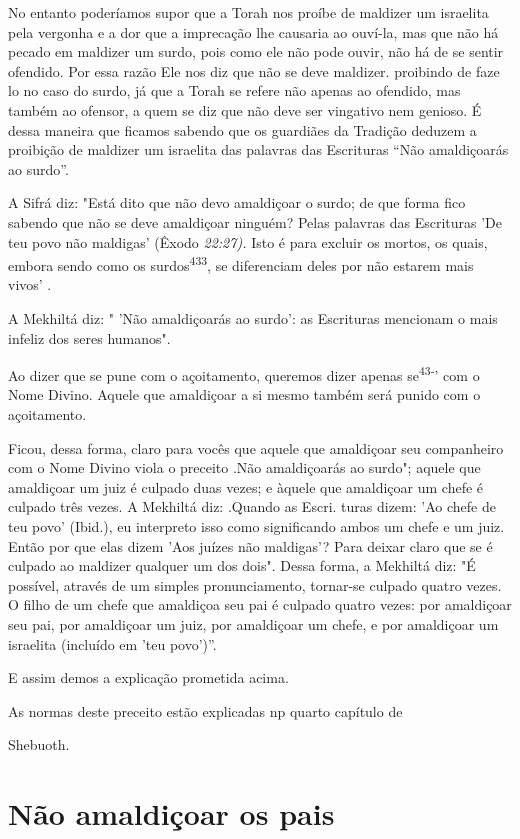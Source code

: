 No entanto poderíamos supor que a Torah nos proíbe de maldizer um
israelita pela vergonha e a dor que a imprecação lhe causaria ao
ouví-la, mas que não há pecado em maldizer um surdo, pois como ele não
pode ouvir, não há de se sentir ofendido. Por essa razão Ele nos diz que
não se deve maldi­zer. proibindo de faze lo no caso do surdo, já que a
Torah se refere não apenas ao ofendido, mas também ao ofensor, a quem se
diz que não deve ser vingati­vo nem genioso. É dessa maneira que ficamos
sabendo que os guardiães da Tra­dição deduzem a proibição de maldizer um
israelita das palavras das Escrituras ``Não amaldiçoarás ao surdo''.

A Sifrá diz: "Está dito que não devo amaldiçoar o surdo; de que for­ma
fico sabendo que não se deve amaldiçoar ninguém? Pelas palavras das
Es­crituras 'De teu povo não maldigas' (Êxodo \emph{22:27).} Isto é para
excluir os mor­tos, os quais, embora sendo como os
surdos\textsuperscript{433}, se diferenciam deles por não estarem mais
vivos' .

A Mekhiltá diz: " 'Não amaldiçoarás ao surdo': as Escrituras mencio­nam
o mais infeliz dos seres humanos".

Ao dizer que se pune com o açoitamento, queremos dizer apenas
se\textsuperscript{43-}' com o Nome Divino. Aquele que amaldiçoar a si
mesmo também será pu­nido com o açoitamento.

Ficou, dessa forma, claro para vocês que aquele que amaldiçoar seu
companheiro com o Nome Divino viola o preceito .Não
amaldiçoarás ao surdo"; aquele que amaldiçoar um juiz é culpado duas
vezes; e àquele que amaldiçoar um chefe é culpado três vezes. A Mekhiltá
diz: .Quando as Escri­. turas dizem: 'Ao chefe de teu
povo' (Ibid.), eu interpreto isso como significan­do ambos um chefe e um
juiz. Então por que elas dizem 'Aos juízes não maldi­gas'? Para deixar
claro que se é culpado ao maldizer qualquer um dos dois". Dessa forma, a
Mekhiltá diz: "É possível, através de um simples pronuncia­mento,
tornar-se culpado quatro vezes. O filho de um chefe que amaldiçoa seu
pai é culpado quatro vezes: por amaldiçoar seu pai, por amaldiçoar um
juiz, por amaldiçoar um chefe, e por amaldiçoar um israelita (incluído
em 'teu povo')''.

E assim demos a explicação prometida acima.


As normas deste preceito estão explicadas np quarto capítulo de


Shebuoth.

\section{Não amaldiçoar os pais}


